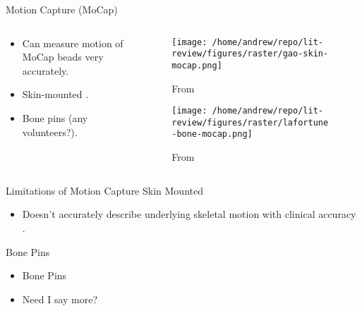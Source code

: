 \documentclass[presentation, aspectratio=1610]{beamer}
\begin{document}
\begin{frame}[label={sec:org647717f}]{Motion Capture (MoCap)}
\begin{columns}
\begin{column}{0.5\columnwidth}
\begin{itemize}
\item Can measure motion of MoCap beads very accurately.
\item Skin-mounted \autocites{gaoInvestigationSoftTissue2008}[][]{kuoInfluenceSoftTissue2011}[][]{linEffectsSoftTissue2016}.
\item Bone pins \autocite{lafortuneThreedimensionalKinematicsHuman1992} (any volunteers?).
\end{itemize}
\end{column}

\begin{column}{0.6\columnwidth}
\begin{figure}[htbp]
\centering
\texttt{[image: /home/andrew/repo/lit-review/figures/raster/gao-skin-mocap.png]}
\caption{From \autocite{gaoInvestigationSoftTissue2008}}
\end{figure}
\vspace{-0.25in}
\begin{figure}[htbp]
\centering
\texttt{[image: /home/andrew/repo/lit-review/figures/raster/lafortune-bone-mocap.png]}
\caption{From \autocite{lafortuneThreedimensionalKinematicsHuman1992}}
\end{figure}
\end{column}
\end{columns}
\end{frame}
\begin{frame}[label={sec:orgd5ae218}]{Limitations of Motion Capture}
Skin Mounted
\begin{itemize}
\item Doesn't accurately describe underlying skeletal motion with clinical accuracy \autocites{gaoInvestigationSoftTissue2008}[][]{kuoInfluenceSoftTissue2011}[][]{linEffectsSoftTissue2016}.
\end{itemize}
Bone Pins
\begin{itemize}
\item Bone Pins
\item Need I say more?
\end{itemize}
\end{frame}
\end{document}
